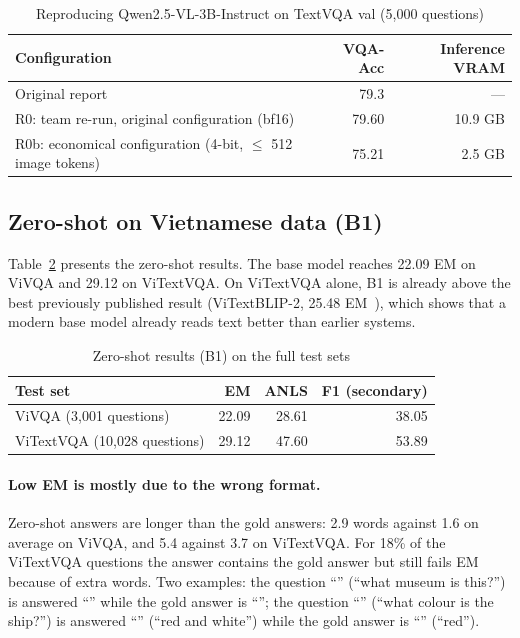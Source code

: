 \begin{table}[htbp]
\caption{Reproducing Qwen2.5-VL-3B-Instruct on TextVQA val (5,000 questions)}
\label{tab:res-r0}
\centering
\small
\begin{tabular}{p{}rr}
\toprule
\textbf{Configuration} & \textbf{VQA-Acc} & \textbf{Inference VRAM} \\
\midrule
Original report~\cite{bai2025qwen25vl} & 79.3 & --- \\
R0: team re-run, original configuration (bf16) & 79.60 & 10.9 GB \\
R0b: economical configuration (4-bit, $\leq$ 512 image tokens) & 75.21 & 2.5 GB \\
\bottomrule
\end{tabular}
\end{table}

\subsection{Zero-shot on Vietnamese data (B1)}

Table~\ref{tab:res-b1} presents the zero-shot results. The base model reaches 22.09 EM on
ViVQA and 29.12 on ViTextVQA. On ViTextVQA alone, B1 is already above the best previously
published result (ViTextBLIP-2, 25.48 EM~\cite{nguyen2024vitextvqa}), which shows that a
modern base model already reads text better than earlier systems.

\begin{table}[htbp]
\caption{Zero-shot results (B1) on the full test sets}
\label{tab:res-b1}
\centering
\small
\begin{tabular}{lrrr}
\toprule
\textbf{Test set} & \textbf{EM} & \textbf{ANLS} & \textbf{F1 (secondary)} \\
\midrule
ViVQA (3,001 questions) & 22.09 & 28.61 & 38.05 \\
ViTextVQA (10,028 questions) & 29.12 & 47.60 & 53.89 \\
\bottomrule
\end{tabular}
\end{table}

\paragraph{Low EM is mostly due to the wrong format.} Zero-shot answers are longer than
the gold answers: 2.9 words against 1.6 on average on ViVQA, and 5.4 against 3.7 on
ViTextVQA. For 18\% of the ViTextVQA questions the answer contains the gold answer but
still fails EM because of extra words. Two examples: the question ``'' (``what museum is this?'') is answered ``'' while
the gold answer is ``''; the question ``'' (``what colour is the ship?'') is answered ``'' (``red and white'')
while the gold answer is ``'' (``red'').


